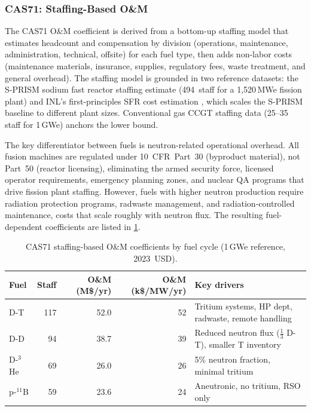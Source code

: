 \documentclass{article}
\begin{document}
\subsubsection{CAS71: Staffing-Based O\&M}
The CAS71 O\&M coefficient is derived from a bottom-up staffing model
that estimates headcount and compensation by division (operations,
maintenance, administration, technical, offsite) for each fuel type,
then adds non-labor costs (maintenance materials, insurance, supplies,
regulatory fees, waste treatment, and general overhead). The staffing
model is grounded in two reference datasets: the S-PRISM sodium fast
reactor staffing estimate \citep{boardman2000} (494~staff for a
1,520\,MWe fission plant) and INL's first-principles SFR cost
estimation \citep{prosser2024}, which scales the S-PRISM baseline to
different plant sizes. Conventional gas CCGT staffing data (25--35
staff for 1\,GWe) anchors the lower bound.

The key differentiator between fuels is neutron-related operational
overhead. All fusion machines are regulated under 10~CFR~Part~30
(byproduct material), not Part~50 (reactor licensing), eliminating
the armed security force, licensed operator requirements, emergency
planning zones, and nuclear QA programs that drive fission plant
staffing. However, fuels with higher neutron production require
radiation protection programs, radwaste management, and
radiation-controlled maintenance, costs that scale roughly with
neutron flux. The resulting fuel-dependent coefficients are listed
in \cref{tab:cas71-staffing}.

\begin{table}[htbp]
\caption{CAS71 staffing-based O\&M coefficients by fuel cycle (1\,GWe reference, 2023~USD).}
\label{tab:cas71-staffing}
\centering
\begin{tabular}{lrrrl}
\toprule
Fuel & Staff & O\&M (M\$/yr) & O\&M (k\$/MW/yr) & Key drivers \\
\midrule
D-T   & 117 & 52.0 & 52 & Tritium systems, HP dept, radwaste, remote handling \\
D-D   &  94 & 38.7 & 39 & Reduced neutron flux ($\tfrac{1}{3}$ D-T), smaller T inventory \\
D-${}^3$He &  69 & 26.0 & 26 & 5\% neutron fraction, minimal tritium \\
p-${}^{11}$B &  59 & 23.6 & 24 & Aneutronic, no tritium, RSO only \\
\bottomrule
\end{tabular}
\end{table}
\end{document}
